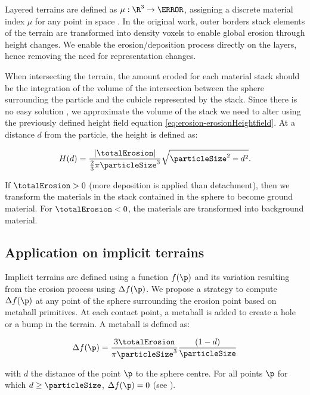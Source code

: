 Layered terrains are defined as $\mu: \R^3 \to \N$, assigning a discrete material index $\mu$ for any point in space \cite{Benes2001, Peytavie2009b}. In the original work, outer borders stack elements of the terrain are transformed into density voxels to enable global erosion through height changes. We enable the erosion/deposition process directly on the layers, hence removing the need for representation changes.

When intersecting the terrain, the amount eroded for each material stack should be the integration of the volume of the intersection between the sphere surrounding the particle and the cubicle represented by the stack. Since there is no easy solution \cite{Jones2017}, we approximate the volume of the stack we need to alter using the previously defined height field equation \eqref{eq:erosion-erosionHeightfield}.  
At a distance $d$ from the particle, the height is defined as:

\begin{align}
    \label{eq:erosion-erosionLayers}
    H(d) = \frac{|\totalErosion|}{\frac{2}{3} \pi \particleSize^3} \sqrt{\particleSize^2 - d^2}.
\end{align}

If $\totalErosion > 0$ (more deposition is applied than detachment), then we transform the materials in the stack contained in the sphere to become ground material. For $\totalErosion < 0$, the materials are transformed into background material.

\subsection{Application on implicit terrains}
\label{sec:erosion-application_on_implicit}

Implicit terrains are defined using a function $f(\p)$ and its variation resulting from the erosion process using $\Delta f(\p)$.  
We propose a strategy to compute $\Delta f(\p)$ at any point of the sphere surrounding the erosion point based on metaball primitives. At each contact point, a metaball is added to create a hole or a bump in the terrain. A metaball is defined as: 

\begin{align}
    \label{eq:erosion-erosionMetaball}
    \Delta f(\p) = \frac{3 \totalErosion}{\pi \particleSize^3} \frac{(1 - d)}{\particleSize}
\end{align}

with $d$ the distance of the point $\p$ to the sphere centre. For all points $\p$ for which $d \geq \particleSize$, $\Delta f(\p) = 0$ (see ).

